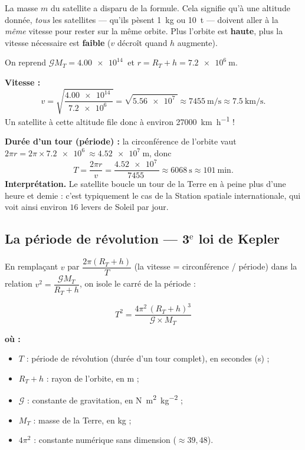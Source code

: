 \documentclass[11pt,a4paper]{article}
\newenvironment{ou}{%
  \par\smallskip\noindent\textbf{où :}\nopagebreak
  \begin{itemize}[leftmargin=1.8em,topsep=2pt,itemsep=1.5pt,parsep=0pt]}%
  {\end{itemize}}
\newcommand{\Grav}{\mathcal{G}}        %
\begin{document}
\begin{remarque}
La masse $m$ du satellite a disparu de la formule. Cela signifie qu'à une altitude
donnée, \emph{tous} les satellites — qu'ils pèsent \SI{1}{\kilogram} ou \SI{10}{\tonne} —
doivent aller à la \emph{même} vitesse pour rester sur la même orbite. Plus l'orbite est
\textbf{haute}, plus la vitesse nécessaire est \textbf{faible} ($v$ décroît quand $h$
augmente).
\end{remarque}

\begin{exemple}
On reprend $\Grav M_T=\SI{4.00e14}{}$ et $r=R_T+h=\SI{7.2e6}{\metre}$.

\smallskip
\textbf{Vitesse :}
\[
v=\sqrt{\frac{\SI{4.00e14}{}}{\SI{7.2e6}{}}}=\sqrt{\SI{5.56e7}{}}
 \approx\SI{7455}{\metre\per\second}\approx\SI{7.5}{\kilo\metre\per\second}.
\]
Un satellite à cette altitude file donc à environ \SI{27000}{\kilo\metre\per\hour} !

\smallskip
\textbf{Durée d'un tour (période) :} la circonférence de l'orbite vaut
$2\pi r=2\pi\times\SI{7.2e6}{}\approx\SI{4.52e7}{\metre}$, donc
\[
T=\frac{2\pi r}{v}=\frac{\SI{4.52e7}{}}{\SI{7455}{}}\approx\SI{6068}{\second}
 \approx\SI{101}{\minute}.
\]
\textbf{Interprétation.} Le satellite boucle un tour de la Terre en à peine plus
d'une heure et demie : c'est typiquement le cas de la Station spatiale internationale,
qui voit ainsi environ $16$ levers de Soleil par jour.
\end{exemple}

\subsection{La période de révolution — 3\texorpdfstring{$^{\text{e}}$}{e} loi de Kepler}

En remplaçant $v$ par $\dfrac{2\pi(R_T+h)}{T}$ (la vitesse = circonférence / période)
dans la relation $v^2=\dfrac{\Grav M_T}{R_T+h}$, on isole le carré de la période :

\begin{formule}
\[
\boxed{\;T^{2}=\dfrac{4\pi^{2}\,(R_T+h)^{3}}{\Grav\times M_T}\;}
\]
\begin{ou}
  \item $T$ : période de révolution (durée d'un tour complet), en secondes (\si{\second}) ;
  \item $R_T+h$ : rayon de l'orbite, en \si{\metre} ;
  \item $\Grav$ : constante de gravitation, en \si{\newton\metre\squared\per\kilogram\squared} ;
  \item $M_T$ : masse de la Terre, en \si{\kilogram} ;
  \item $4\pi^2$ : constante numérique sans dimension ($\approx 39{,}48$).
\end{ou}
\end{formule}
\end{document}
